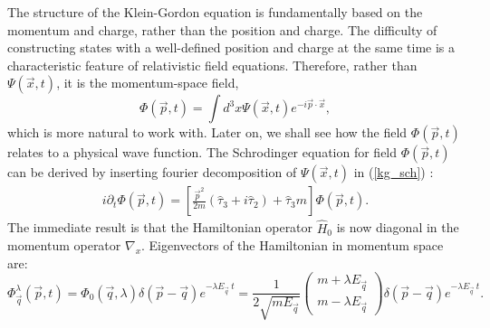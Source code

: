 \documentclass[11pt]{article}
\numberwithin{equation}{section}
\begin{document}
      The structure of the Klein-Gordon equation is fundamentally based on the momentum and charge, rather than the position and charge.
      The difficulty of constructing states with a well-defined position and charge at the same time is a characteristic feature
      of relativistic field equations\cite{localization}. Therefore, rather than $\Psi(\vec x,t)$, it is the momentum-space field,
      \begin{equation}
      \Phi(\vec p, t) = \int d^3 x \Psi(\vec x, t) e^{-i \vec p \cdot \vec x},
      \end{equation}
      which is more natural to work with.
      Later on, we shall see how the field $\Phi(\vec p, t)$ relates to a physical wave function.
      The Schrodinger equation for field $\Phi(\vec p,t)$ can be derived by inserting fourier decomposition of $\Psi(\vec x, t)$ in (\ref{kg_sch}) \cite{feshbach}:
      \begin{gather}
       i \partial_t \Phi(\vec p, t) = \left[ \frac{\vec{p}^2}{2m} (\hat\tau_3 + i\hat\tau_2)  + \hat\tau_3 m\right] \Phi(\vec p, t).
      \end{gather}
      The immediate result is that the Hamiltonian operator $\hat H_0$ is now diagonal in the momentum operator $\nabla_x$.
      Eigenvectors of the Hamiltonian in momentum space are:
        \begin{equation}
        \Phi^{\lambda}_{\vec q }(\vec p, t) = 
        \Phi_0(\vec q,\lambda)
        \delta(\vec p - \vec q)
        e^{-\lambda E_{\vec{q}} \ t}
        =
          \frac{1}{2 \sqrt{m E_{\vec q}}}
          \begin{pmatrix}
            m + \lambda E_{\vec q} \\
            m - \lambda E_{\vec q}
          \end{pmatrix}
          \delta(\vec p - \vec q)
          e^{-\lambda E_{\vec{q}} \ t}.
      \end{equation}
\end{document}
